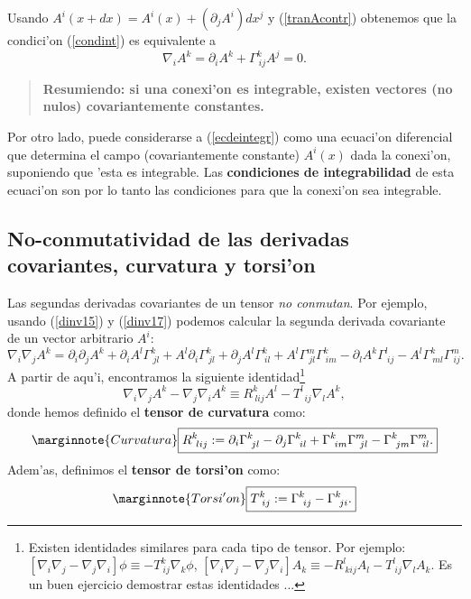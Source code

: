 Usando $A^i(x+dx)=A^i(x)+(\partial_j A^i)dx^j $ y (\ref{tranAcontr}) obtenemos que
la condici'on (\ref{condint}) es equivalente a
\begin{equation}
\nabla_i A^k=\partial_i A^k+\Gamma_{\ ij}^k A^j =0.
\label{ecdeintegr}%
\end{equation}
\begin{quotation}
\textbf{Resumiendo: si una conexi'on es integrable, existen vectores (no nulos) covariantemente constantes.}
\end{quotation}
Por otro lado, puede considerarse a (\ref{ecdeintegr}) como una ecuaci'on
diferencial que determina el campo (covariantemente constante) $A^i(x)$ dada la conexi'on, suponiendo que 'esta es integrable. Las \textbf{condiciones de
integrabilidad} de esta ecuaci'on son por lo tanto las condiciones para que la
conexi'on sea integrable.


\subsection{No-conmutatividad de las derivadas covariantes, curvatura y torsi'on}\label{sec:RT}
Las segundas derivadas covariantes de un tensor \textit{no conmutan}.
Por ejemplo, usando (\ref{dinv15}) y (\ref{dinv17}) podemos calcular la segunda derivada covariante de un vector arbitrario $A^i$:
\begin{equation}
\nabla_i \nabla_jA^k =\partial_i \partial_jA^k +\partial_i A^l\Gamma_{\ jl}^k +A^l\partial_i \Gamma_{\ jl}^k +\partial_jA^l\Gamma_{\ il}^k
+A^l\Gamma_{\ jl}^m\Gamma_{\ im}^k -\partial_{l}A^k \Gamma_{\ ij}^l-A^l\Gamma_{\ ml}^k \Gamma_{\ ij}^m. \label{segder1}
\end{equation}
A partir de aqu'i, encontramos la siguiente identidad\footnote{Existen identidades similares para cada tipo de tensor. Por ejemplo: $\left[\nabla_i \nabla_j -\nabla_j\nabla_i\right]\phi\equiv -T_{\ ij}^{k} \nabla_k\phi$,  $\left[\nabla_i \nabla_j -\nabla_j\nabla_i\right]A_k\equiv -R_{\ kij}^lA_l - T_{\ ij}^{l} \nabla_lA_k$. Es un buen ejercicio demostrar estas identidades ...}
\begin{equation}
\boxed{\nabla_i \nabla_jA^k -\nabla_j\nabla_i A^{k}\equiv R_{\ lij}^k
A^l - T_{\ \ ij}^l \nabla_l A^k ,} \label{cdc}
\end{equation}
donde hemos definido el \textbf{tensor de curvatura} como:
\begin{equation}\marginnote{Curvatura}
\boxed{R_{\ lij}^k :=\partial_i\Gamma_{\ jl}^k -\partial_j\Gamma_{\ il}^k 
+\Gamma_{\ im}^k \Gamma_{\ jl}^m -\Gamma_{\ jm}^k \Gamma_{\ il}^m .}
\label{curvatura}
\end{equation}
Adem'as, definimos el \textbf{tensor de torsi'on} como:
\begin{equation}\marginnote{Torsi'on}
\boxed{T_{\ ij}^k :=\Gamma_{\ ij}^k -\Gamma_{\ ji}^k .}
\end{equation}

